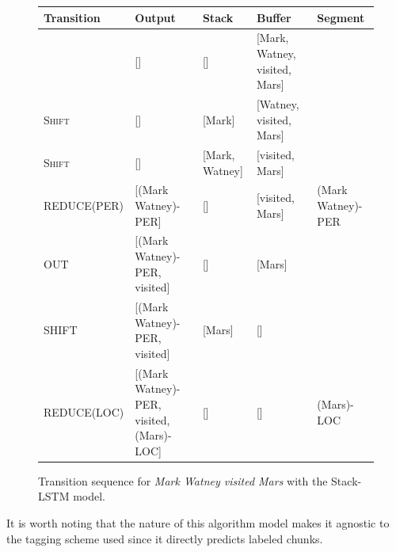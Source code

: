 \documentclass[11pt,letterpaper]{article}
\begin{document}
\begin{figure}[t]
  \begin{center}
    \centering
    \begin{scriptsize}
      \begin{tabular}{lllll}\textbf{Transition}&\textbf{Output}&\textbf{Stack}&\textbf{Buffer}&\textbf{Segment}\\
      \hline
        &[]&[]&[Mark, Watney, visited, Mars]&\\
        \textsc{Shift}&[]&[Mark]&[Watney, visited, Mars]&\\
        \textsc{Shift}&[]&[Mark, Watney]&[visited, Mars]&\\
        \textsc{REDUCE(PER)}&[(Mark Watney)-PER]&[]&[visited, Mars]& (Mark Watney)-PER\\
        \textsc{OUT}&[(Mark Watney)-PER, visited]&[]&[Mars]&\\
        \textsc{SHIFT}&[(Mark Watney)-PER, visited]&[Mars]&[]&\\
        \textsc{REDUCE(LOC)}&[(Mark Watney)-PER, visited, (Mars)-LOC]&[]&[]& (Mars)-LOC\\
      \end{tabular}
    \end{scriptsize}
    \caption{Transition sequence for \emph{Mark Watney visited Mars} with the Stack-LSTM model.}
    \label{parsingexample}
  \end{center}
\end{figure}

It is worth noting that the nature of this algorithm model makes it agnostic to the tagging scheme used since it directly predicts labeled chunks.

\end{document}
